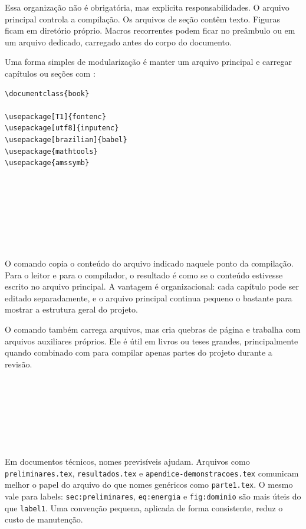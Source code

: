 Essa organização não é obrigatória, mas explicita responsabilidades. O arquivo principal controla a compilação. Os arquivos de seção contêm texto. Figuras ficam em diretório próprio. Macros recorrentes podem ficar no preâmbulo ou em um arquivo dedicado, carregado antes do corpo do documento.

Uma forma simples de modularização é manter um arquivo principal e carregar capítulos ou seções com \verb||:

\begin{lstlisting}[language={[latex]TeX}, caption={Arquivo principal com capítulos separados}]
\documentclass{book}

\usepackage[T1]{fontenc}
\usepackage[utf8]{inputenc}
\usepackage[brazilian]{babel}
\usepackage{mathtools}
\usepackage{amssymb}








\end{lstlisting}

O comando \verb|| copia o conteúdo do arquivo indicado naquele ponto da compilação. Para o leitor e para o compilador, o resultado é como se o conteúdo estivesse escrito no arquivo principal. A vantagem é organizacional: cada capítulo pode ser editado separadamente, e o arquivo principal continua pequeno o bastante para mostrar a estrutura geral do projeto.

O comando \verb|| também carrega arquivos, mas cria quebras de página e trabalha com arquivos auxiliares próprios. Ele é útil em livros ou teses grandes, principalmente quando combinado com \verb|| para compilar apenas partes do projeto durante a revisão.

\begin{lstlisting}[language={[latex]TeX}, caption={Compilação parcial com includeonly}]







\end{lstlisting}

Em documentos técnicos, nomes previsíveis ajudam. Arquivos como \texttt{preliminares.tex}, \texttt{resultados.tex} e \texttt{apendice-demonstracoes.tex} comunicam melhor o papel do arquivo do que nomes genéricos como \texttt{parte1.tex}. O mesmo vale para labels: \verb|sec:preliminares|, \verb|eq:energia| e \verb|fig:dominio| são mais úteis do que \verb|label1|. Uma convenção pequena, aplicada de forma consistente, reduz o custo de manutenção.

